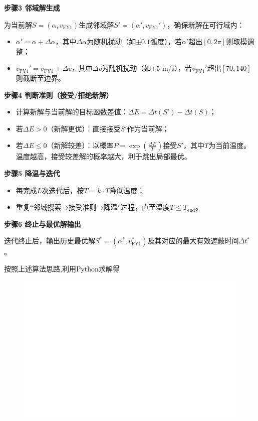 \documentclass[../main.tex]{subfiles}
\begin{document}
\noindent\textbf{步骤3 邻域解生成}

为当前解$S=(\alpha, v_{\text{FY1}})$生成邻域解$S'=(\alpha', v_{\text{FY1}}')$，确保新解在可行域内：
\begin{itemize}
    \item $\alpha' = \alpha + \Delta\alpha$，其中$\Delta\alpha$为随机扰动（如$\pm0.1$弧度），若$\alpha'$超出$[0,2\pi]$则取模调整；
    \item $v_{\text{FY1}}' = v_{\text{FY1}} + \Delta v$，其中$\Delta v$为随机扰动（如$\pm5$ m/s），若$v_{\text{FY1}}'$超出$[70,140]$则截断至边界。
\end{itemize}

\noindent\textbf{步骤4 判断准则（接受/拒绝新解）}
\begin{itemize}
    \item 计算新解与当前解的目标函数差值：$\Delta E = \Delta t(S') - \Delta t(S)$；
    \item 若$\Delta E > 0$（新解更优）：直接接受$S'$作为当前解；
    \item 若$\Delta E \leq 0$（新解较差）：以概率$P = \exp\left(\frac{\Delta E}{T}\right)$接受$S'$，其中$T$为当前温度。温度越高，接受较差解的概率越大，利于跳出局部最优。
\end{itemize}

\noindent\textbf{步骤5 降温与迭代}
\begin{itemize}
    \item 每完成$L$次迭代后，按$T = k \cdot T$降低温度；
    \item 重复“邻域搜索→接受准则→降温”过程，直至温度$T \leq T_{\text{end}}$。
\end{itemize}

\noindent\textbf{步骤6 终止与最优解输出}

迭代终止后，输出历史最优解$S^*=(\alpha^*, v_{\text{FY1}}^*)$及其对应的最大有效遮蔽时间$\Delta t^*$。

按照上述算法思路,利用Python求解得

\begin{figure}[H]
\centering
\includegraphics[scale=0.5]{标记图.png}
\caption{}
\label{图4}
\end{figure}
\end{document}
